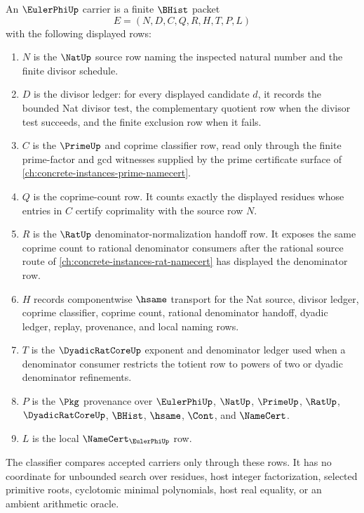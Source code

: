 \begin{definition}
\label{def:euler-phi-carrier}
An $\EulerPhiUp$ carrier is a finite $\BHist$ packet
$$
E=(N,D,C,Q,R,H,T,P,L)
$$
with the following displayed rows:
\begin{enumerate}
\item $N$ is the $\NatUp$ source row naming the inspected natural number and the finite divisor schedule.
\item $D$ is the divisor ledger: for every displayed candidate $d$, it records the bounded Nat divisor test, the complementary quotient row when the divisor test succeeds, and the finite exclusion row when it fails.
\item $C$ is the $\PrimeUp$ and coprime classifier row, read only through the finite prime-factor and gcd witnesses supplied by the prime certificate surface of \autoref{ch:concrete-instances-prime-namecert}.
\item $Q$ is the coprime-count row. It counts exactly the displayed residues whose entries in $C$ certify coprimality with the source row $N$.
\item $R$ is the $\RatUp$ denominator-normalization handoff row. It exposes the same coprime count to rational denominator consumers after the rational source route of \autoref{ch:concrete-instances-rat-namecert} has displayed the denominator row.
\item $H$ records componentwise $\hsame$ transport for the Nat source, divisor ledger, coprime classifier, coprime count, rational denominator handoff, dyadic ledger, replay, provenance, and local naming rows.
\item $T$ is the $\DyadicRatCoreUp$ exponent and denominator ledger used when a denominator consumer restricts the totient row to powers of two or dyadic denominator refinements.
\item $P$ is the $\Pkg$ provenance over $\EulerPhiUp$, $\NatUp$, $\PrimeUp$, $\RatUp$, $\DyadicRatCoreUp$, $\BHist$, $\hsame$, $\Cont$, and $\NameCert$.
\item $L$ is the local $\NameCert_{\EulerPhiUp}$ row.
\end{enumerate}
The classifier compares accepted carriers only through these rows. It has no coordinate for unbounded search over residues, host integer factorization, selected primitive roots, cyclotomic minimal polynomials, host real equality, or an ambient arithmetic oracle.
\end{definition}

